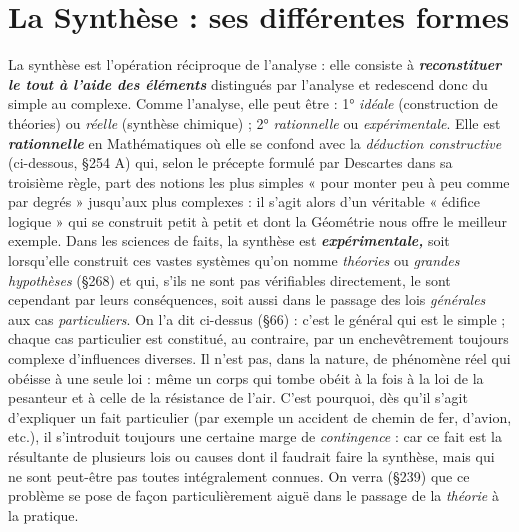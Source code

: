 \section{La Synthèse : ses différentes formes}%
La synthèse est
l'opération réciproque de l'analyse : elle consiste à \textbf{\textit {reconstituer le
tout à l’aide des éléments}} distingués par l'analyse et redescend donc
du simple au complexe. Comme l’analyse, elle peut être : 1° {\it idéale}
(construction de théories) ou {\it réelle} (synthèse chimique) ; 2° {\it rationnelle}
ou {\it expérimentale}. Elle est \textbf{\textit {rationnelle}} en Mathématiques où elle
se confond avec la {\it déduction constructive} (ci-dessous, \S 254 A) qui, selon
le précepte formulé par Descartes dans sa troisième règle, part des
notions les plus simples « pour monter peu à peu comme par degrés »
jusqu'aux plus complexes : il s’agit alors d’un véritable « édifice
logique » qui se construit petit à petit et dont la Géométrie nous
offre le meilleur exemple. Dans les sciences de faits, la synthèse est
\textbf{\textit {expérimentale,}} soit lorsqu'elle construit ces vastes systèmes qu’on
nomme {\it théories} ou {\it grandes hypothèses} (\S 268) et qui, s’ils ne sont pas
vérifiables directement, le sont cependant par leurs conséquences,
soit aussi dans le passage des lois {\it générales} aux cas {\it particuliers}. On
l’a dit ci-dessus (\S 66) : c’est le général qui est le simple ; chaque
cas particulier est constitué, au contraire, par un enchevêtrement
toujours complexe d’influences diverses. Il n’est pas, dans la nature,
de phénomène réel qui obéisse à une seule loi : même un corps qui
tombe obéit à la fois à la loi de la pesanteur et à celle de la résistance de
l'air. C’est pourquoi, dès qu’il s’agit d’expliquer un fait particulier
(par exemple un accident de chemin de fer, d'avion, etc.), il s’introduit
toujours une certaine marge de {\it contingence} : car ce fait est la
résultante de plusieurs lois ou causes dont il faudrait faire la synthèse,
mais qui ne sont peut-être pas toutes intégralement connues. On
verra (\S 239) que ce problème se pose de façon particulièrement aiguë
dans le passage de la {\it théorie} à la pratique.

